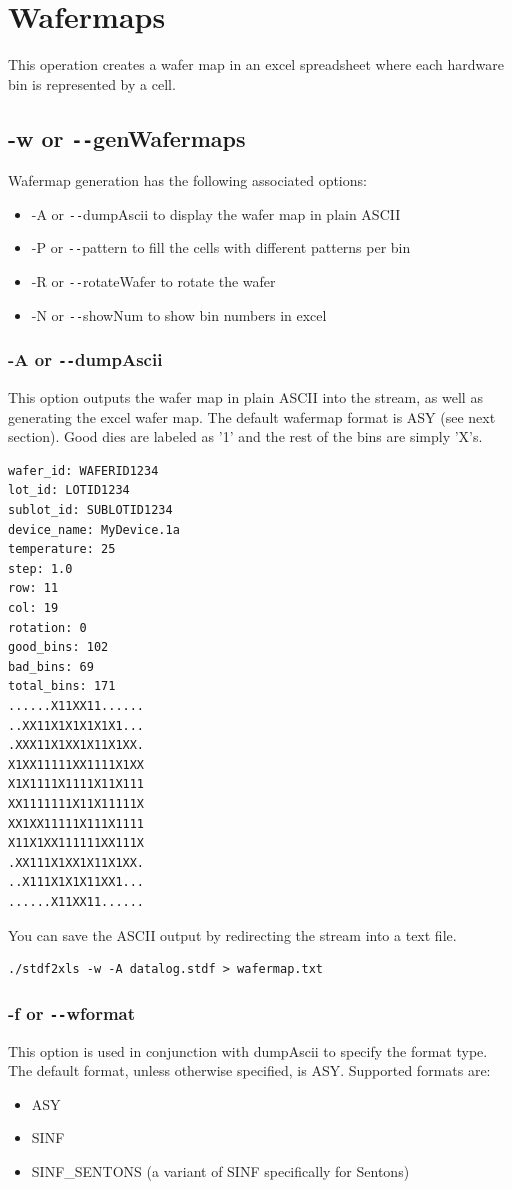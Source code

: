 \documentclass[letterpaper]{article}
\begin{document}
\section{\bf Wafermaps}
This operation creates a wafer map in an excel spreadsheet where each hardware bin is represented by a cell.
\subsection{\bf -w or \texttt{-{}-}genWafermaps}
Wafermap generation has the following associated options:
\begin{itemize}
	\item -A or \texttt{-{}-}dumpAscii to display the wafer map in plain ASCII
	\item -P or \texttt{-{}-}pattern to fill the cells with different patterns per bin
	\item -R or \texttt{-{}-}rotateWafer to rotate the wafer
	\item -N or \texttt{-{}-}showNum to show bin numbers in excel
\end{itemize}
\subsubsection{\bf -A or \texttt{-{}-}dumpAscii}
This option outputs the wafer map in plain ASCII into the stream, as well as generating the excel wafer map. The default wafermap format is ASY (see next section). Good dies are labeled as '1' and the rest of the bins are simply 'X's.
\begin{verbatim}
wafer_id: WAFERID1234
lot_id: LOTID1234
sublot_id: SUBLOTID1234
device_name: MyDevice.1a
temperature: 25
step: 1.0
row: 11
col: 19
rotation: 0
good_bins: 102
bad_bins: 69
total_bins: 171
......X11XX11......
..XX11X1X1X1X1X1...
.XXX11X1XX1X11X1XX.
X1XX11111XX1111X1XX
X1X1111X1111X11X111
XX1111111X11X11111X
XX1XX11111X111X1111
X11X1XX111111XX111X
.XX111X1XX1X11X1XX.
..X111X1X1X11XX1...
......X11XX11......
\end{verbatim}
You can save the ASCII output by redirecting the stream into a text file.
\begin{verbatim}
./stdf2xls -w -A datalog.stdf > wafermap.txt
\end{verbatim}
\subsubsection{\bf -f or \texttt{-{}-}wformat}
This option is used in conjunction with dumpAscii to specify the format type. The default format, unless otherwise specified, is ASY. Supported formats are:
\begin{itemize}
	\item ASY
	\item SINF
	\item SINF\_SENTONS (a variant of SINF specifically for Sentons)
\end{itemize}
\end{document}
